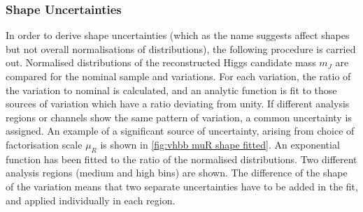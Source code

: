 \subsubsection{Shape Uncertainties}
In order to derive shape uncertainties (which as the name suggests affect shapes but not overall normalisations of distributions), the following procedure is carried out. Normalised distributions of the reconstructed Higgs candidate mass $m_J$ are compared for the nominal sample and variations. For each variation, the ratio of the variation to nominal is calculated, and an analytic function is fit to those sources of variation which have a ratio deviating from unity. If different analysis regions or channels show the same pattern of variation, a common uncertainty is assigned. An example of a significant source of uncertainty, arising from choice of factorisation scale $\mu_R$ is shown in \cref{fig:vhbb muR shape fitted}. An exponential function has been fitted to the ratio of the normalised distributions. Two different analysis regions (medium and high \pTV bins) are shown. The difference of the shape of the variation means that two separate uncertainties have to be added in the fit, and applied individually in each \pTV region. 
%
